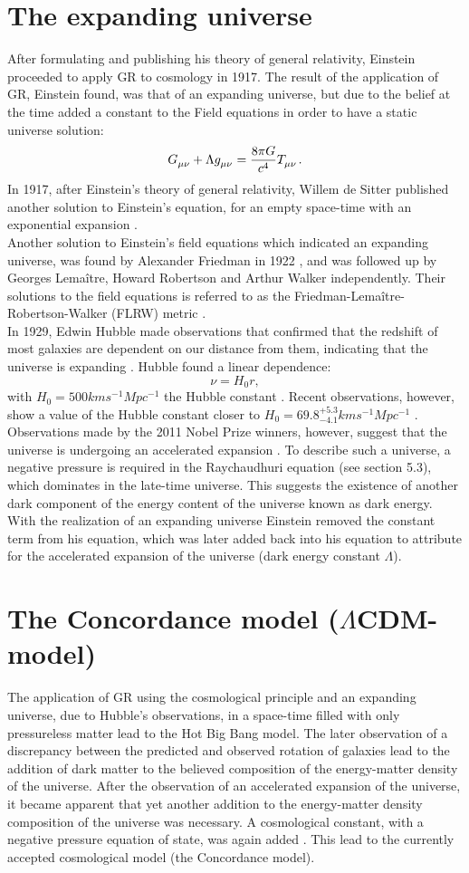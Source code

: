\documentclass[a4paper, 11pt]{FSKH_623_Report}
\numberwithin{equation}{section}
\begin{document}
\section{The expanding universe}
After formulating and publishing his theory of general relativity, Einstein proceeded to apply GR to cosmology in 1917. The result of the application of GR, Einstein found, was that of an expanding universe, but due to the belief at the time added a constant to the Field equations in order to have a static universe solution: $$\tensor{G}{_{\mu\nu}}+\Lambda\tensor{g}{_{\mu\nu}}=\frac{8\pi G}{c^{4}}\tensor{T}{_{\mu\nu}}.$$ In 1917, after Einstein's theory of general relativity, Willem de Sitter published another solution to Einstein's equation, for an empty space-time with an exponential expansion \citep{ITC, NPSNe}.\\
Another solution to Einstein's field equations which indicated an expanding universe, was found by Alexander Friedman in 1922 \citep{Friedman1922}, and was followed up by Georges Lema\^itre, Howard Robertson and Arthur Walker independently. Their solutions to the field equations is referred to as the Friedman-Lema\^itre-Robertson-Walker (FLRW) metric \citep{GRFD}.\\
In 1929, Edwin Hubble made observations that confirmed that the redshift of most galaxies are dependent on our distance from them, indicating that the universe is expanding \citep{GRFD}. Hubble found a linear dependence: $$\nu=H_{0}r,$$ with $H_{0}=500km s^{-1} Mpc^{-1}$ the Hubble constant \citep{Hubble168}. Recent observations, however, show a value of the Hubble constant closer to $H_{0}=69.8^{+5.3}_{-4.1}km s^{-1}Mpc^{-1}$ \citep{HPValue}. Observations made by the 2011 Nobel Prize winners, however, suggest that the universe is undergoing an accelerated expansion \citep{NPSNe}.
To describe such a universe, a negative pressure is required in the Raychaudhuri equation (see section 5.3), which dominates in the late-time universe. This suggests the existence of another dark component of the energy content of the universe known as dark energy.\\
With the realization of an expanding universe Einstein removed the constant term from his equation, which was later added back into his equation to attribute for the accelerated expansion of the universe (dark energy constant $\Lambda$).
\section{The Concordance model ($\Lambda$CDM-model)}
The application of GR using the cosmological principle and an expanding universe, due to Hubble's observations, in a space-time filled with only pressureless matter lead to the Hot Big Bang model. The later observation of a discrepancy between the  predicted and observed rotation of galaxies lead to the addition of dark matter to the believed composition of the energy-matter density of the universe. After the observation of an accelerated expansion of the universe, it became apparent that yet another addition to the energy-matter density composition of the universe was necessary. A cosmological constant, with a negative pressure equation of state, was again added \citep{GRFD}. This lead to the currently accepted cosmological model (the Concordance model).
\end{document}
